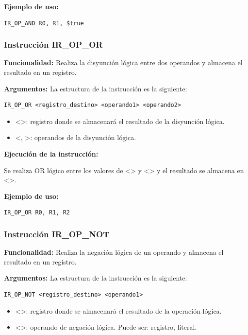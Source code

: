 \noindent
\textbf{Ejemplo de uso:}
\begin{verbatim}
IR_OP_AND R0, R1, $true
\end{verbatim}

\subsubsection{Instrucción IR\_OP\_OR}\label{subsubsec:IR_OP_OR}
\noindent
\textbf{Funcionalidad:} Realiza la disyunción lógica entre dos operandos y almacena el resultado en un registro.

\noindent
\textbf{Argumentos:} La estructura de la instrucción es la siguiente:
\begin{verbatim}
IR_OP_OR <registro_destino> <operando1> <operando2>
\end{verbatim}
\begin{itemize}
    \item <>: registro donde se almacenará el resultado de la disyunción lógica.
    \item <, >: operandos de la disyunción lógica.
\end{itemize}

\noindent
\textbf{Ejecución de la instrucción:}
\vspace{0.3cm}

\noindent
Se realiza OR lógico entre los valores de <> y <> y el resultado se almacena en <>.
\vspace{0.3cm}

\noindent
\textbf{Ejemplo de uso:}
\begin{verbatim}
IR_OP_OR R0, R1, R2
\end{verbatim}

\subsubsection{Instrucción IR\_OP\_NOT}\label{subsubsec:IR_OP_NOT}
\noindent
\textbf{Funcionalidad:} Realiza la negación lógica de un operando y almacena el resultado en un registro.

\noindent
\textbf{Argumentos:} La estructura de la instrucción es la siguiente:
\begin{verbatim}
IR_OP_NOT <registro_destino> <operando1>
\end{verbatim}
\begin{itemize}
    \item <>: registro donde se almacenará el resultado de la operación lógica.
    \item <>: operando de negación lógica. Puede ser: registro, literal.
\end{itemize}

